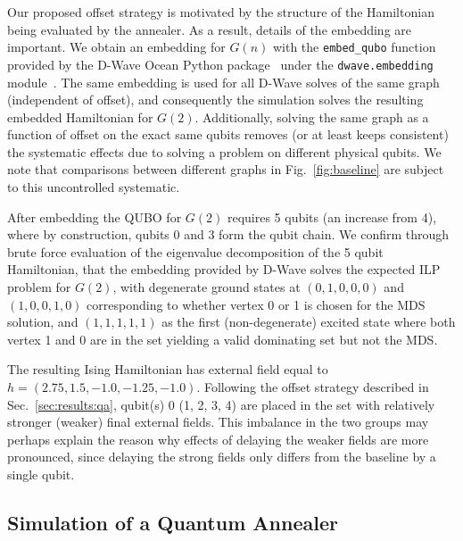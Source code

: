 \documentclass[10pt]{iopart}
\begin{document}
Our proposed offset strategy is motivated by the structure of the Hamiltonian being evaluated by the annealer.
As a result, details of the embedding are important. We obtain an embedding for $G(n)$ with the \texttt{embed\_qubo} function provided by the D-Wave Ocean Python package~\cite{dwave_oceans} under the \texttt{dwave.embedding} module~\cite{2008arXiv0804.4884C}.
The same embedding is used for all D-Wave solves of the same graph (independent of offset), and consequently the simulation solves the resulting embedded Hamiltonian for $G(2)$.
Additionally, solving the same graph as a function of offset on the exact same qubits removes (or at least keeps consistent) the systematic effects due to solving a problem on different physical qubits.
We note that comparisons between different graphs in Fig.~\ref{fig:baseline} are subject to this uncontrolled systematic.

After embedding the QUBO for $G(2)$ requires 5 qubits (an increase from 4), where by construction, qubits 0 and 3 form the qubit chain.
We confirm through brute force evaluation of the eigenvalue decomposition of the 5 qubit Hamiltonian, that the embedding provided by D-Wave solves the expected ILP problem for $G(2)$, with degenerate ground states at $(0, 1, 0, 0, 0)$ and $(1, 0, 0, 1, 0)$ corresponding to whether vertex 0 or 1 is chosen for the MDS solution, and $(1, 1, 1, 1, 1)$ as the first (non-degenerate) excited state where both vertex 1 and 0 are in the set yielding a valid dominating set but not the MDS.

The resulting Ising Hamiltonian has external field equal to $h = (2.75, 1.5, -1.0, -1.25, -1.0)$.
Following the offset strategy described in Sec.~\ref{sec:results:qa}, qubit(s) 0 (1, 2, 3, 4) are placed in the set with relatively stronger (weaker) final external fields.
This imbalance in the two groups may perhaps explain the reason why effects of delaying the weaker fields are more pronounced, since delaying the strong fields only differs from the baseline by a single qubit.



\subsection{Simulation of a Quantum Annealer}
\label{sec:methods:simulation}

\end{document}
